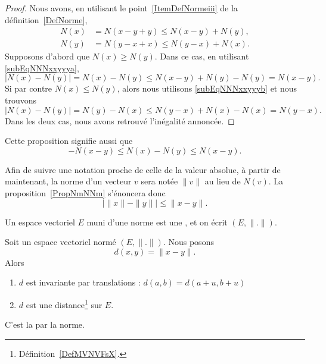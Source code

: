 \begin{proof}
	Nous avons, en utilisant le point~\ref{ItemDefNormeiii} de la définition~\ref{DefNorme},
	\begin{subequations}
		\begin{align}
			N(x)&=N(x-y+y)\leq N(x-y)+N(y),	\label{subEqNNNxxyyya}\\
			N(y)&=N(y-x+x)\leq N(y-x)+N(x).	\label{subEqNNNxxyyyb}
		\end{align}
	\end{subequations}
	Supposons d'abord que $N(x)\geq N(y)$. Dans ce cas, en utilisant \eqref{subEqNNNxxyyya},
	\begin{equation}
		\big| N(x)-N(y) \big|=N(x)-N(y)\leq N(x-y)+N(y)-N(y)=N(x-y).
	\end{equation}
	Si par contre $N(x)\leq N(y)$, alors nous utilisons \eqref{subEqNNNxxyyyb} et nous trouvons
	\begin{equation}
		\big| N(x)-N(y) \big|=N(y)-N(x)\leq N(y-x)+N(x)-N(x)=N(y-x).
	\end{equation}
	Dans les deux cas, nous avons retrouvé l'inégalité annoncée.
\end{proof}
Cette proposition signifie aussi que
\begin{equation}	\label{EqNleqNNleqNvqlqbs}
	-N(x-y)\leq N(x)-N(y)\leq N(x-y).
\end{equation}

Afin de suivre une notation proche de celle de la valeur absolue, à partir de maintenant, la norme d'un vecteur $v$ sera notée $\| v\|$ au lieu de $N(v)$. La proposition~\ref{PropNmNNm} s'énoncera donc
\begin{equation}
\big| \| x \|-\| y \| \big|\leq \| x-y \|.
\end{equation}
\begin{definition}		\label{DefEVNetDistance}
	Un espace vectoriel $E$ muni d'une norme est une , et on écrit $(E,\| . \|)$.
\end{definition}

\begin{lemmaDef}        \label{LEMooWGBJooYTDYIK}
    Soit un espace vectoriel normé \( (E,\| . \|)\). Nous posons
    \begin{equation}        \label{EQooZYJRooAHnsIG}
        d(x,y)=\| x-y \| .
    \end{equation}
    Alors
    \begin{enumerate}
        \item       \label{ITEMooLITDooPeReOk}
            \( d\) est invariante par translations : $d(a,b)=d(a+u,b+u)$
        \item
            \( d\) est une distance\footnote{Définition~\ref{DefMVNVFsX}.} sur \( E\).
    \end{enumerate}
    C'est la  par la norme.
\end{lemmaDef}

